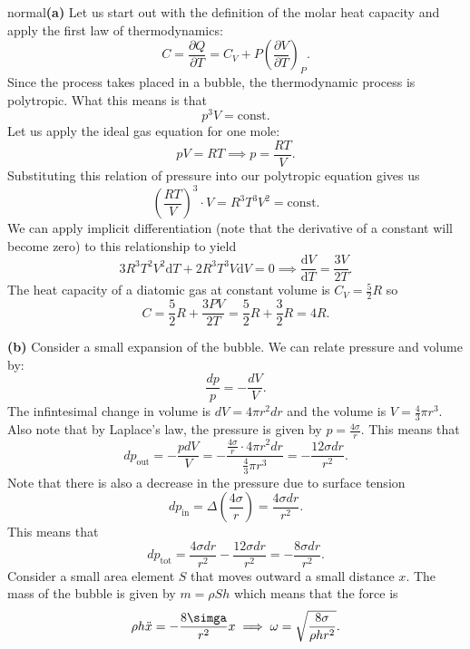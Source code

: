\begin{solution}{normal}\textbf{(a)} Let us start out with the definition of the molar heat capacity and apply the first law of thermodynamics:
\[C = \frac{\partial Q}{\partial T} = C_V + P\left(\frac{\partial V}{\partial T}\right)_P.\]
Since the process takes placed in a bubble, the thermodynamic process is polytropic. What this means is that 
\[p^3 V = \text{const.}\]
Let us apply the ideal gas equation for one mole:
\[pV = RT\implies p = \frac{RT}{V}.\]
Substituting this relation of pressure into our polytropic equation gives us 
\[\left(\frac{RT}{V}\right)^3\cdot V = R^3 T^3 V^2 = \text{const.}\]
We can apply implicit differentiation (note that the derivative of a constant will become zero) to this relationship to yield 
\[3R^3 T^2 V^2 \text{d}T + 2R^3 T^3 V \text{d}V = 0\implies \frac{\text{d}V}{\text{d}T} = \frac{3V}{2T}.\]
The heat capacity of a diatomic gas at constant volume is $C_V = \frac{5}{2}R$ so 
\[C = \frac{5}{2}R + \frac{3PV}{2T} = \frac{5}{2}R + \frac{3}{2}R = \boxed{4R}.\]
\vspace{3mm}

\noindent \textbf{(b)} Consider a small expansion of the bubble. We can relate pressure and volume by:
\[\frac{dp}{p} = -\frac{dV}{V}.\]
The infintesimal change in volume is $dV = 4\pi r^2 dr$ and the volume is $V = \frac{4}{3}\pi r^3$. Also note that by Laplace's law, the pressure is given by $p = \frac{4\sigma}{r}$. This means that 
\[dp_{\text{out}} = -\frac{p dV}{V} = -\frac{\frac{4\sigma}{r}\cdot 4\pi r^2 dr}{\frac{4}{3}\pi r^3} = -\frac{12\sigma dr}{r^2}.\]
Note that there is also a decrease in the pressure due to surface tension 
\[dp_{\text{in}} = \Delta \left(\frac{4\sigma}{r}\right) = \frac{4\sigma dr}{r^2}.\]
This means that 
\[dp_{\text{tot}} = \frac{4\sigma dr}{r^2} - \frac{12\sigma dr}{r^2} = -\frac{8\sigma dr}{r^2}.\]
Consider a small area element $S$ that moves outward a small distance $x$. The mass of the bubble is given by $m = \rho Sh$ which means that the force is 
\[\rho h\ddot{x} = -\frac{8\simga}{r^2}x\implies \omega = \sqrt{\frac{8\sigma}{\rho h r^2}}.\]
\end{solution}